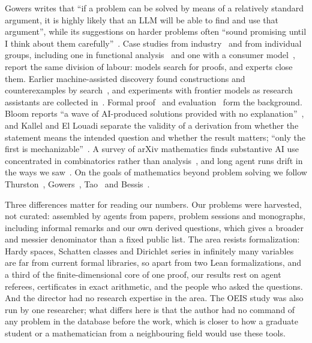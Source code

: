 \documentclass[11pt]{amsart}
\begin{document}
Gowers writes that ``if a problem can be solved by means of a relatively
standard argument, it is highly likely that an LLM will be able to find and use
that argument'', while its suggestions on harder problems often ``sound
promising until I think about them carefully''~\cite{gowersblog}. Case studies
from industry~\cites{woodruff,comathematician} and from individual groups,
including one in functional analysis~\cite{banachlattices} and one with a
consumer model~\cite{vibe}, report the same division of labour: models search
for proofs, and experts close them. Earlier machine-assisted discovery found
constructions and counterexamples by
search~\cites{davies,wagner,funsearch,alphaevolve,georgiev}, and experiments
with frontier models as research assistants are collected in~\cite{bubeck}.
Formal proof~\cites{polu,htps,alphageometry,mathlib,avigad} and
evaluation~\cites{frieder,collins,frontiermath,hle,firstproof} form the
background. Bloom reports ``a wave of AI-produced solutions provided with no
explanation''~\cite{bloomchanges}, and Kallel and El Louadi separate the
validity of a derivation from whether the statement means the intended question
and whether the result matters; ``only the first is
mechanizable''~\cite{kallel}. A survey of arXiv mathematics finds substantive
AI use concentrated in combinatorics rather than analysis~\cite{goldrush}, and
long agent runs drift in the ways we saw~\cite{leanmarathon}. On the goals of
mathematics beyond problem solving we follow Thurston~\cite{thurston},
Gowers~\cite{gowers}, Tao~\cites{tao-good,tao-age} and Bessis~\cite{bessis}.

Three differences matter for reading our numbers. Our problems were harvested,
not curated: assembled by agents from papers, problem sessions and monographs,
including informal remarks and our own derived questions, which gives a broader
and messier denominator than a fixed public list. The area resists
formalization: Hardy spaces, Schatten classes and Dirichlet series in
infinitely many variables are far from current formal libraries, so apart from
two Lean formalizations, and a third of the finite-dimensional core of one
proof, our results rest on agent referees, certificates in exact arithmetic,
and the people who asked the questions. And the director had no research
expertise in the area. The OEIS study was also run by one researcher; what
differs here is that the author had no command of any problem in the database
before the work, which is closer to how a graduate student or a mathematician
from a neighbouring field would use these tools.
\end{document}
